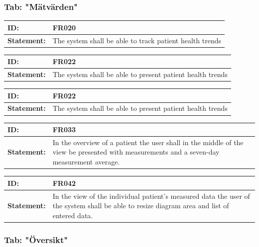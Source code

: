 \documentclass{scrreprt}
\begin{document}
\subsubsection{Tab: "Mätvärden"}
\begin{center}

\begin{tabularx}{\linewidth}{| l | X |}
 \hline
 \textbf{ID:} & FR020  \\ 
 \hline
 \textbf{Statement:} & The system shall be able to track patient health trends
 \\ 
 \hline
\end{tabularx}

\begin{tabularx}{\linewidth}{| l | X |}
 \hline
 \textbf{ID:} & FR022  \\ 
 \hline
 \textbf{Statement:} & The system shall be able to present patient health trends
 \\ 
 \hline
\end{tabularx}

\begin{tabularx}{\linewidth}{| l | X |}
 \hline
 \textbf{ID:} & FR022  \\ 
 \hline
 \textbf{Statement:} & The system shall be able to present patient health trends
 \\ 
 \hline
\end{tabularx}

\begin{tabularx}{\linewidth}{| l | X |}
 \hline
 \textbf{ID:} & FR033  \\ 
 \hline
 \textbf{Statement:} & In the overview of a patient the user shall in the middle of the view be presented with measurements and a seven-day measurement average.
 \\ 
 \hline
\end{tabularx}

\begin{tabularx}{\linewidth}{| l | X |}
 \hline
 \textbf{ID:} & FR042  \\ 
 \hline
 \textbf{Statement:} & In the view of the individual patient's measured data the user of the system shall be able to resize diagram area and list of entered data.
 \\ 
 \hline
\end{tabularx}

\end{center}

\subsubsection{Tab: "Översikt"}
\end{document}
